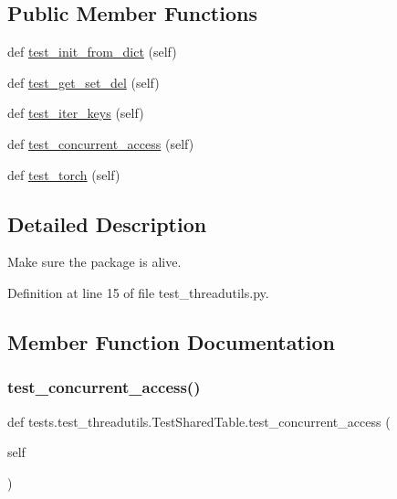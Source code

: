 \subsection*{Public Member Functions}
\begin{DoxyCompactItemize}
\item 
def \hyperlink{classtests_1_1test__threadutils_1_1TestSharedTable_a877c1284bd99fe9f44c4b744b4bae9d8}{test\+\_\+init\+\_\+from\+\_\+dict} (self)
\item 
def \hyperlink{classtests_1_1test__threadutils_1_1TestSharedTable_a5afcb2be145212a9d06f2f2ecd45da68}{test\+\_\+get\+\_\+set\+\_\+del} (self)
\item 
def \hyperlink{classtests_1_1test__threadutils_1_1TestSharedTable_ad83a5fe7bed1811264f41406c3ec8976}{test\+\_\+iter\+\_\+keys} (self)
\item 
def \hyperlink{classtests_1_1test__threadutils_1_1TestSharedTable_ad8ca4e7c8fbc4e8ddb170158fe01c861}{test\+\_\+concurrent\+\_\+access} (self)
\item 
def \hyperlink{classtests_1_1test__threadutils_1_1TestSharedTable_a44071985cd8526645fb0f2c41fddbff9}{test\+\_\+torch} (self)
\end{DoxyCompactItemize}


\subsection{Detailed Description}
\begin{DoxyVerb}Make sure the package is alive.
\end{DoxyVerb}
 

Definition at line 15 of file test\+\_\+threadutils.\+py.



\subsection{Member Function Documentation}
\mbox{\label{classtests_1_1test__threadutils_1_1TestSharedTable_ad8ca4e7c8fbc4e8ddb170158fe01c861}} 
\subsubsection{\texorpdfstring{test\+\_\+concurrent\+\_\+access()}{test\_concurrent\_access()}}
{\footnotesize\ttfamily def tests.\+test\+\_\+threadutils.\+Test\+Shared\+Table.\+test\+\_\+concurrent\+\_\+access (\begin{DoxyParamCaption}\item[{}]{self }\end{DoxyParamCaption})}



